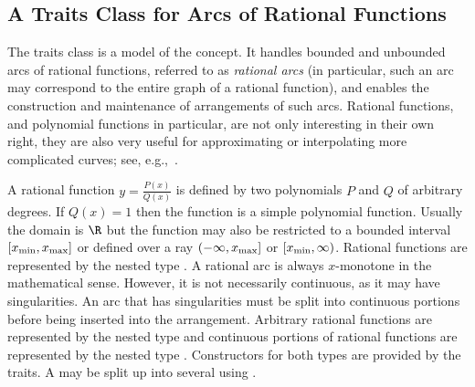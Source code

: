 
\subsection{A Traits Class for Arcs of Rational Functions\label{arr_ssec:tr_ratfunc}}

The traits class
 is a model
of the  concept. It handles bounded and
unbounded arcs of rational functions, referred to as
\emph{rational arcs} (in particular, such an arc may correspond to the
entire graph of a rational function), and enables the construction and
maintenance of arrangements of such arcs. Rational functions, and
polynomial functions in particular, are not only interesting in their
own right, they are also very useful for approximating or
interpolating more complicated curves; see,
e.g.,~\cite[Chapter~3]{cgal:ptvf-nrcpp-02}.

A rational function $y = \frac{P(x)}{Q(x)}$ is defined by two
polynomials $P$ and $Q$ of arbitrary degrees.  If $Q(x) = 1$ then
the function is a simple polynomial function. Usually the domain is
$\R$ but the function may also be restricted to a bounded interval
$[x_{\rm min}, x_{\rm max}]$ or defined over a ray
$(-\infty, x_{\rm max}]$ or $[x_{\rm min}, \infty)$. Rational
functions are represented by the nested type .
A rational arc is always $x$-monotone in the mathematical
sense. However, it is not necessarily continuous, as it may have
singularities. An arc that has singularities must 
be split into continuous portions before being inserted into the
arrangement. Arbitrary rational functions are represented by the 
nested type  and continuous portions of rational
functions are represented by the nested type
. Constructors for both types are provided by
the traits. A  may be split up into several
 using .

